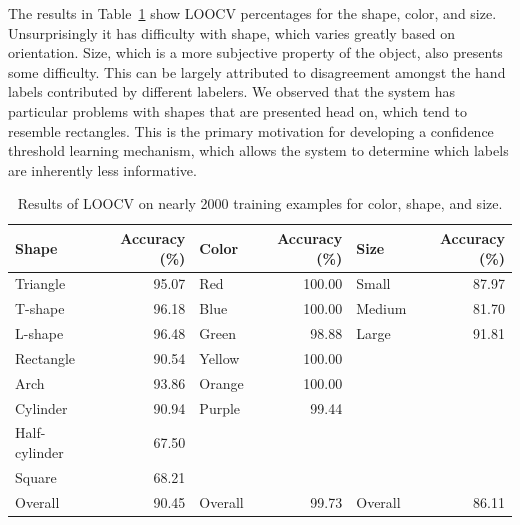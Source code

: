 \documentclass[11pt]{article}
\begin{document}
The results in Table~\ref{tbl:testresults} show LOOCV percentages
for the shape, color, and size. Unsurprisingly it has difficulty with shape,
which varies greatly based on orientation. Size, which is a more subjective
property of the object, also presents some difficulty. This can be largely
attributed to disagreement amongst the hand labels contributed by different
labelers. We observed that the system has particular problems with shapes that
are presented head on, which tend to resemble rectangles.  This is the primary
motivation for developing a confidence threshold learning mechanism, which
allows the system to determine which labels are inherently less informative.

\begin{table}
    \centering
    \begin{tabular}{||l|r||l|r||l|r||}
        \hline
        Shape         & Accuracy (\%) & Color   & Accuracy (\%) & Size &Accuracy (\%) \\ \hline \hline
        Triangle      & 95.07                & Red     & 100.00               & Small   & 87.97               \\ \hline
        T-shape       & 96.18                & Blue    & 100.00               & Medium  &   81.70             \\ \hline
        L-shape       & 96.48                & Green   & 98.88                & Large   & 91.81               \\ \hline
        Rectangle     & 90.54                & Yellow  & 100.00               & ~  &   ~             \\ \hline
        Arch          & 93.86                & Orange  & 100.00               & ~       & ~                   \\ \hline
        Cylinder      & 90.94                & Purple  & 99.44                & ~       & ~                   \\ \hline
        Half-cylinder & 67.50                & ~        & ~                     & ~       & ~                   \\ \hline
        Square        & 68.21                & ~       & ~                      & ~       & ~                   \\ \hline
        Overall       & 90.45                & Overall       & 99.73         & Overall      & 86.11                   \\
        \hline
    \end{tabular}
    \caption{Results of LOOCV on nearly 2000 training examples for color, shape, and size.}
	\label{tbl:testresults}
\end{table}
\end{document}
